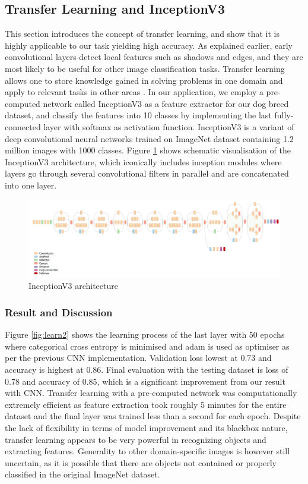 \documentclass[11pt,titlepage,oneside,openany]{article}
\begin{document}
\subsection{Transfer Learning and InceptionV3}

This section introduces the concept of transfer learning, and show that it is highly applicable to our task yielding high accuracy. As explained earlier, early convolutional layers detect local features such as shadows and edges, and they are most likely to be useful for other image classification tasks. Transfer learning allows one to store knowledge gained in solving problems in one domain and apply to relevant tasks in other areas \cite{R17}. In our application, we employ a pre-computed network called InceptionV3 as a feature extractor for our dog breed dataset, and classify the features into 10 classes by implementing the last fully-connected layer with softmax as activation function. InceptionV3 \cite{inc15} is a variant of deep convolutional neural networks trained on ImageNet dataset containing 1.2 million images with 1000 classes. Figure \ref{fig:incep} shows schematic visualisation of the InceptionV3 architecture, which iconically includes inception modules where layers go through several convolutional filters in parallel and are concatenated into one layer.

\begin{figure}[h]
	\centering
	\includegraphics[width=12cm]{inception}
	\caption{InceptionV3 architecture}
	\label{fig:incep}
\end{figure}

\subsubsection*{Result and Discussion}
Figure \ref{fig:learn2} shows the learning process of the last layer with 50 epochs where categorical cross entropy is minimised and adam is used as optimiser as per the previous CNN implementation. Validation loss lowest at 0.73 and accuracy is highest at 0.86. Final evaluation with the testing dataset is loss of 0.78 and accuracy of 0.85, which is a significant improvement from our result with CNN. Transfer learning with a pre-computed network was computationally extremely efficient as feature extraction took roughly 5 minutes for the entire dataset and the final layer was trained less than a second for each epoch. Despite the lack of flexibility in terms of model improvement and its blackbox nature, transfer learning appears to be very powerful in recognizing objects and extracting features. Generality to other domain-specific images is however still uncertain, as it is possible that there are objects not contained or properly classified in the original ImageNet dataset.
\end{document}
